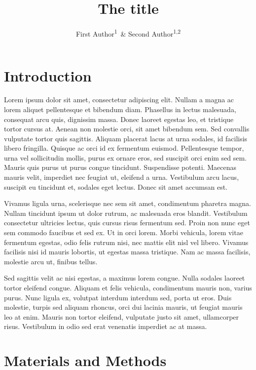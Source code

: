 \documentclass[man,floatsintext]{apa6}
\title{The title}
\author{First Author\textsuperscript{1}~\& Second Author\textsuperscript{1,2}}
\date{}
\affiliation{
\vspace{0.5cm}
\textsuperscript{1} School 1\\\textsuperscript{2} Institute B}
\begin{document}
\maketitle

\hypertarget{introduction}{%
\section{Introduction}\label{introduction}}

Lorem ipsum dolor sit amet, consectetur adipiscing elit. Nullam a magna
ac lorem aliquet pellentesque et bibendum diam. Phasellus in lectus
malesuada, consequat arcu quis, dignissim massa. Donec laoreet egestas
leo, et tristique tortor cursus at. Aenean non molestie orci, sit amet
bibendum sem. Sed convallis vulputate tortor quis sagittis. Aliquam
placerat lacus at urna sodales, id facilisis libero fringilla. Quisque
ac orci id ex fermentum euismod. Pellentesque tempor, urna vel
sollicitudin mollis, purus ex ornare eros, sed suscipit orci enim sed
sem. Mauris quis purus ut purus congue tincidunt. Suspendisse potenti.
Maecenas mauris velit, imperdiet nec feugiat ut, eleifend a urna.
Vestibulum arcu lacus, suscipit eu tincidunt et, sodales eget lectus.
Donec sit amet accumsan est.

Vivamus ligula urna, scelerisque nec sem sit amet, condimentum pharetra
magna. Nullam tincidunt ipsum ut dolor rutrum, ac malesuada eros
blandit. Vestibulum consectetur ultricies lectus, quis cursus risus
fermentum sed. Proin non nunc eget sem commodo faucibus et sed ex. Ut in
orci lorem. Morbi vehicula, lorem vitae fermentum egestas, odio felis
rutrum nisi, nec mattis elit nisl vel libero. Vivamus facilisis nisi id
mauris lobortis, ut egestas massa tristique. Nam ac massa facilisis,
molestie arcu ut, finibus tellus.

Sed sagittis velit ac nisi egestas, a maximus lorem congue. Nulla
sodales laoreet tortor eleifend congue. Aliquam et felis vehicula,
condimentum mauris non, varius purus. Nunc ligula ex, volutpat interdum
interdum sed, porta ut eros. Duis molestie, turpis sed aliquam rhoncus,
orci dui lacinia mauris, ut feugiat mauris leo at enim. Mauris non
tortor eleifend, vulputate justo sit amet, ullamcorper risus. Vestibulum
in odio sed erat venenatis imperdiet ac at massa.

\hypertarget{materials-and-methods}{%
\section{Materials and Methods}\label{materials-and-methods}}
\end{document}
